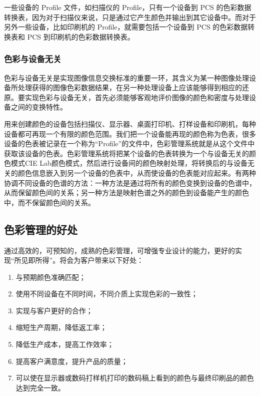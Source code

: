         一些设备的 Profile 文件，如扫描仪的 Profile，只有一个设备到 PCS 的色彩数据转换表，因为对于扫描仪来说，只是通过它产生颜色并输出到其它设备中。而对于另外一些设备，比如印刷机的 Profile，就需要包括一个设备到 PCS 的色彩数据转换表和 PCS 到印刷机的色彩数据转换表。

    \subsubsection { 色彩与设备无关}

        色彩与设备无关是实现图像信息交换标准的重要一环，其含义为某一种图像处理设备所处理获得的图像色彩数据结果，在另一种处理设备上应该能够得到相应的还原。要实现色彩与设备无关，首先必须能够客观地评价图像的颜色和密度与处理设备之间的变换特性。

        用来创建颜色的设备包括扫描仪、显示器、桌面打印机、打样设备和印刷机，每种设备都可再现一个有限的颜色范围。我们把一个设备能再现的颜色称为色表，很多设备的色表被记录在一个称为“Profile”的文件中，色彩管理系统就是从这个文件中获取该设备的色表。色彩管理系统将把某个设备的色表转换为一个与设备无关的颜色模式CIE Lab颜色模式，然后进行设备间的颜色映射处理，将转换后的与设备无关的颜色信息嵌入到另一个设备的色表中，从而使设备的色表能对应起来。有两种协调不同设备的色谱的方法：一种方法是通过将所有的颜色变换到设备的色谱中，从而保留颜色间的关系；另一种方法是映射色谱之外的颜色到设备能产生的颜色中，而不保留颜色间的关系。

\subsection { 色彩管理的好处}

        通过高效的，可预知的，成熟的色彩管理，可增强专业设计的能力，更好的实现“所见即所得”。将会为客户带来以下好处：
    \begin{enumerate}
        \item  与预期颜色准确匹配；
        \item  使用不同设备在不同时间，不同介质上实现色彩的一致性；
        \item  实现与客户更好的合作；
        \item  缩短生产周期，降低返工率；
        \item  降低生产成本，提高工作效率；
        \item  提高客户满意度，提升产品的质量；
        \item  可以使在显示器或数码打样机打印的数码稿上看到的颜色与最终印刷品的颜色达到完全一致。
    \end{enumerate}
